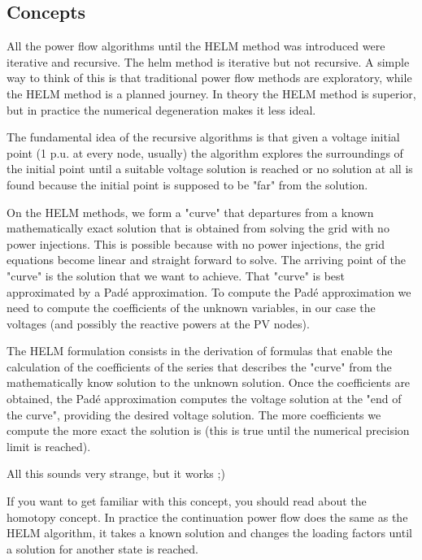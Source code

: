 \documentclass[nols,a4paper,twoside,symmetric,notoc,fleqn]{tufte-book}
\begin{document}
\subsection{Concepts}

All the power flow algorithms until the HELM method was introduced were iterative and recursive. The helm method is iterative but not recursive. A simple way to think of this is that traditional power flow methods are exploratory, while the HELM method is a planned journey. In theory the HELM method is superior, but in practice the numerical degeneration makes it less ideal.

The fundamental idea of the recursive algorithms is that given a voltage initial point (1 p.u. at every node, usually) the algorithm explores the surroundings of the initial point until a suitable voltage solution is reached or no solution at all is found because the initial point is supposed to be "far" from the solution.

On the HELM methods, we form a "curve" that departures from a known mathematically exact solution that is obtained from solving the grid with no power injections. This is possible because with no power injections, the grid equations become linear and straight forward to solve. The arriving point of the "curve" is the solution that we want to achieve. That "curve" is best approximated by a Pad\'e approximation. To compute the Pad\'e approximation we need to compute the coefficients of the unknown variables, in our case the voltages (and possibly the reactive powers at the PV nodes).

The HELM formulation consists in the derivation of formulas that enable the calculation of the coefficients of the series that describes the "curve" from the mathematically know solution to the unknown solution. Once the coefficients are obtained, the Pad\'e approximation computes the voltage solution at the "end of the curve", providing the desired voltage solution. The more coefficients we compute the more exact the solution is (this is true until the numerical precision limit is reached).\newline 


All this sounds very strange, but it works ;)\newline 


If you want to get familiar with this concept, you should read about the homotopy concept. In practice the continuation power flow does the same as the HELM algorithm, it takes a known solution and changes the loading factors until a solution for another state is reached.
\end{document}
